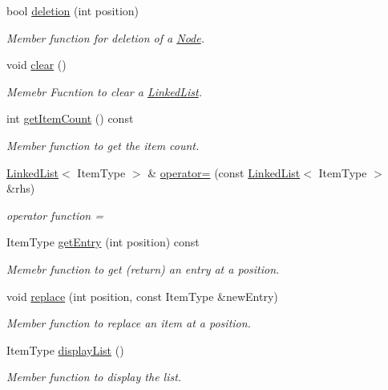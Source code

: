 \begin{DoxyCompactItemize}
bool \hyperlink{classLinkedList_a7dc3cca217b45c6fe5d28c9d16b7bf9e}{deletion} (int position)
\begin{DoxyCompactList}\small\item\em Member function for deletion of a \hyperlink{classNode}{Node}. \end{DoxyCompactList}\item 
void \hyperlink{classLinkedList_a7d1d9cf83eef67b6c4d700a3cc5970e1}{clear} ()
\begin{DoxyCompactList}\small\item\em Memebr Fucntion to clear a \hyperlink{classLinkedList}{Linked\+List}. \end{DoxyCompactList}\item 
int \hyperlink{classLinkedList_afc6635f854f48f2f126cf3b60d845220}{get\+Item\+Count} () const
\begin{DoxyCompactList}\small\item\em Member function to get the item count. \end{DoxyCompactList}\item 
\hyperlink{classLinkedList}{Linked\+List}$<$ Item\+Type $>$ \& \hyperlink{classLinkedList_a25b0fba69e66b0fa409be992530029bc}{operator=} (const \hyperlink{classLinkedList}{Linked\+List}$<$ Item\+Type $>$ \&rhs)
\begin{DoxyCompactList}\small\item\em operator function = \end{DoxyCompactList}\item 
Item\+Type \hyperlink{classLinkedList_a341bfd7772c9d24d29eb7a7f3936915b}{get\+Entry} (int position) const
\begin{DoxyCompactList}\small\item\em Memebr function to get (return) an entry at a position. \end{DoxyCompactList}\item 
void \hyperlink{classLinkedList_a3035f880c50e7d8f68e67c093d4607ca}{replace} (int position, const Item\+Type \&new\+Entry)
\begin{DoxyCompactList}\small\item\em Member function to replace an item at a position. \end{DoxyCompactList}\item 
Item\+Type \hyperlink{classLinkedList_a65fb58d9f9b8af41e9569d1dc3200583}{display\+List} ()
\begin{DoxyCompactList}\small\item\em Member function to display the list. \end{DoxyCompactList}\end{DoxyCompactItemize}


